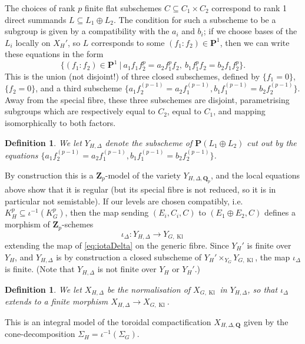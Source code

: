 \documentclass[cjm]{ipart}
\theoremstyle{plain}
\newtheorem{definition}[theorem]{Definition}
\theoremstyle{remark}
\DeclareMathOperator{\Kl}{Kl}
\newcommand{\QQ}{\mathbf{Q}}
\newcommand{\Qp}{\QQ_p}
\newcommand{\Zp}{\mathbf{Z}_p}
\numberwithin{equation}{subsection}
\begin{document}
  The choices of rank $p$ finite flat subschemes $C \subseteq C_1 \times C_2$ correspond to rank 1 direct summands $L \subseteq L_1 \oplus L_2$. The condition for such a subscheme to be a subgroup is given by a compatibility with the $a_i$ and $b_i$; if we choose bases of the $L_i$ locally on $X_{H}'$, so $L$ corresponds to some $(f_1: f_2) \in \mathbf{P}^1$, then we can write these equations in the form
  \[
   \{ (f_1 : f_2) \in \mathbf{P}^1\ |\ a_1 f_1 f_2^{p} = a_2 f_1^{p} f_2,\ b_1 f_1^p f_2 = b_2 f_1 f_2^p \}.
  \]
  This is the union (not disjoint!) of three closed subschemes, defined by $\{ f_1 = 0\}$, $\{ f_2 = 0\}$, and a third subscheme $\{ a_1 f_2^{(p-1)} = a_2 f_1^{(p-1)}, b_1 f_1^{(p-1)} = b_2 f_2^{(p-1)} \}$. Away from the special fibre, these three subschemes are disjoint, parametrising subgroups which are respectively equal to $C_2$, equal to $C_1$, and mapping isomorphically to both factors.

  \begin{definition}
   We let $Y_{H, \Delta}$ denote the subscheme of $\mathbf{P}(L_1 \oplus L_2)$ cut out by the equations $\{ a_1 f_2^{(p-1)} = a_2 f_1^{(p-1)}, b_1 f_1^{(p-1)} = b_2 f_2^{(p-1)} \}$.
  \end{definition}

  By construction this is a $\Zp$-model of the variety $Y_{H, \Delta, \Qp}$, and the local equations above show that it is regular (but its special fibre is not reduced, so it is in particular not semistable). If our levels are chosen compatibly, i.e.~$K^p_H \subseteq \iota^{-1}(K^p_G)$, then the map sending $(E_i, C_i, C)$ to $(E_1 \oplus E_2, C)$ defines a morphism of $\Zp$-schemes
  \[ \iota_{\Delta}: Y_{H, \Delta} \to Y_{G, \Kl}\]
  extending the map of \eqref{eq:iotaDelta} on the generic fibre. Since $Y_H'$ is finite over $Y_H$, and $Y_{H, \Delta}$ is by construction a closed subscheme of $Y_H' \times_{Y_G} Y_{G, \Kl}$, the map $\iota_{\Delta}$ is finite. (Note that $Y_{H, \Delta}$ is not finite over $Y_H$ or $Y_H'$.)

  \begin{definition}
   We let $X_{H, \Delta}$ be the normalisation of $X_{G, \Kl}$ in $Y_{H, \Delta}$, so that $\iota_{\Delta}$ extends to a finite morphism $X_{H, \Delta} \to X_{G, \Kl}$.
  \end{definition}

  This is an integral model of the toroidal compactification $X_{H, \Delta, \QQ}$ given by the cone-decomposition $\Sigma_H= \iota^{-1}(\Sigma_G)$.
\end{document}
